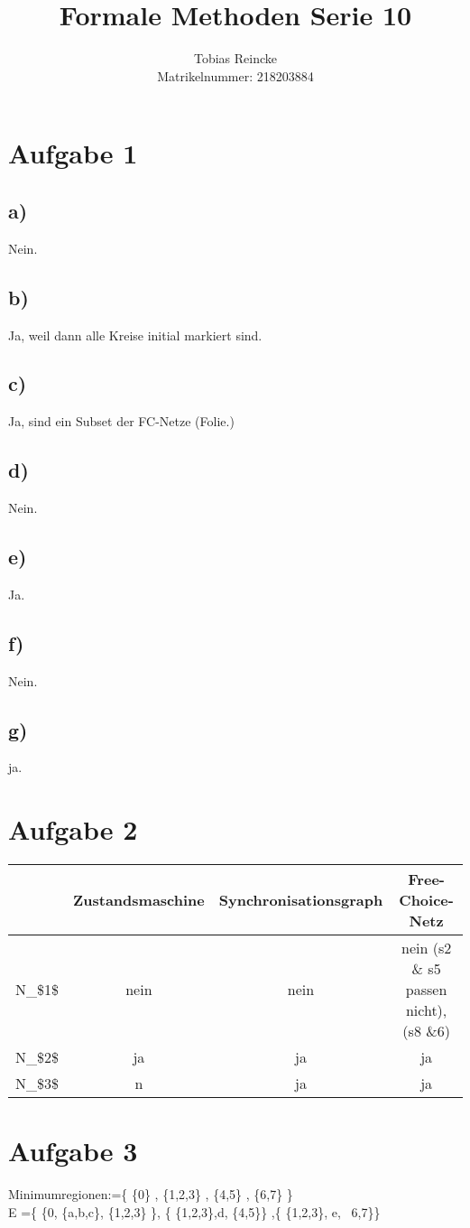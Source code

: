 \documentclass[]{article}
\title{Formale Methoden Serie 10}
\author{Tobias Reincke\\Matrikelnummer: 218203884}
\begin{document}
\maketitle



\section{Aufgabe 1}
\subsection{a)}
Nein.
\subsection{b)}
Ja, weil dann alle Kreise initial markiert sind.
\subsection{c)}
Ja, sind ein Subset der FC-Netze (Folie.)
\subsection{d)}
Nein.
\subsection{e)}
Ja.
\subsection{f)}
Nein.
\subsection{g)}
ja.


\section{Aufgabe 2}
\begin{tabular}{|c|c|c|c|}
	\hline
	& Zustandsmaschine & Synchronisationsgraph & Free-Choice-Netz \\
	\hline
	N\_\$1\$ & nein & nein & nein (s2 \& s5 passen nicht), (s8 \&6)   \\
	\hline
	N\_\$2\$ & ja & ja & ja \\
	\hline
	N\_\$3\$ & n & ja & ja \\
	\hline
\end{tabular}

\section{Aufgabe 3}
Minimumregionen:=\{ \{0\} , \{1,2,3\} , \{4,5\}  , \{6,7\}  \}\\
E =\{ \{0, \{a,b,c\},  \{1,2,3\}  \}, \{ \{1,2,3\},d, \{4,5\}\} ,\{ \{1,2,3\}, e, \ {6,7}\}\}
\end{document}
